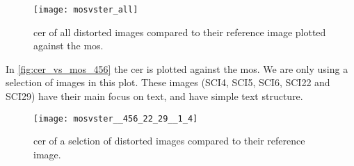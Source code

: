 \begin{figure}[h]
    \centering
    \texttt{[image: mosvster\_all]}
    \caption{\gls{cer} of all distorted images compared to their reference image plotted against the \gls{mos}.}
    \label{fig:cer_vs_mos}
\end{figure}

In \autoref{fig:cer_vs_mos_456} the \gls{cer} is plotted against the \gls{mos}.
We are only using a selection of images in this plot.
These images (SCI4, SCI5, SCI6, SCI22 and SCI29) have their main focus on text, and have simple text structure.
\begin{figure}[h]
    \centering
    \texttt{[image: mosvster\_\_456\_22\_29\_\_1\_4]}
    \caption{\gls{cer} of a selction of distorted images compared to their reference image.}
    \label{fig:cer_vs_mos_456}
\end{figure}
